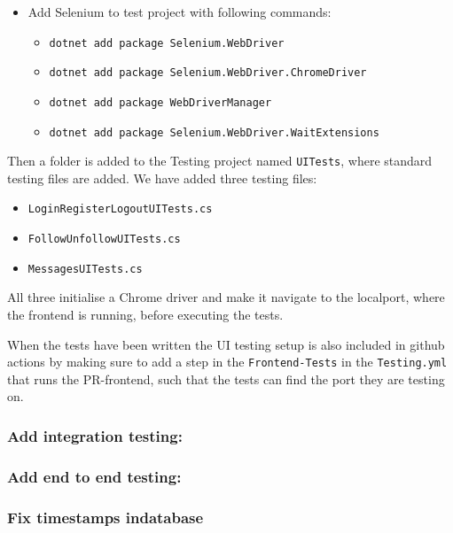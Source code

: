 \begin{itemize}
    \item Add Selenium to test project with following commands:

    \begin{itemize}
        \item \texttt{dotnet\ add\ package\ Selenium.WebDriver}
        \item \texttt{dotnet\ add\ package\ Selenium.WebDriver.ChromeDriver}
        \item \texttt{dotnet\ add\ package\ WebDriverManager}
        \item \texttt{dotnet\ add\ package\ Selenium.WebDriver.WaitExtensions}
    \end{itemize}
\end{itemize}
Then a folder is added to the Testing project named \texttt{UITests}, where standard testing files are added.
We have added three testing files:

\begin{itemize}
    \item \texttt{LoginRegisterLogoutUITests.cs}
    \item \texttt{FollowUnfollowUITests.cs}
    \item \texttt{MessagesUITests.cs}
\end{itemize}
All three initialise a Chrome driver and make it navigate to the localport, where the frontend is running, before executing the tests.

When the tests have been written the UI testing setup is also included in github actions by making sure to add a step in the \texttt{Frontend-Tests} in the \texttt{Testing.yml} that runs the PR-frontend, such that the tests can find the port they are testing on.

\subsubsection{Add integration testing:}
\label{log:add-integration-testing}

\subsubsection{Add end to end testing:}
\label{log:add-end-to-end-testing}

\subsubsection{Fix timestamps indatabase}
\label{log:fix-timestamps-in-database}

